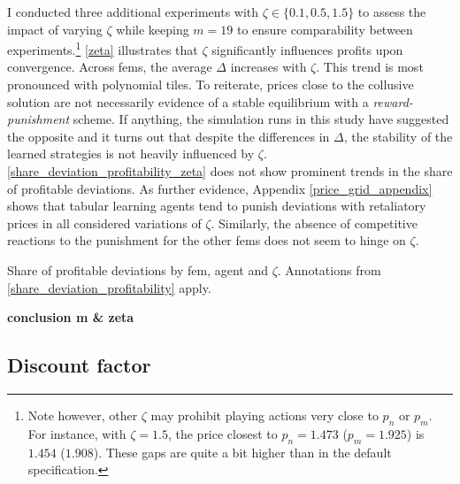 I conducted three additional experiments with $\zeta \in \{0.1, 0.5, 1.5\}$ to assess the impact of varying $\zeta$ while keeping $m=19$ to ensure comparability between experiments.\footnote{Note however, other $\zeta$ may prohibit playing actions very close to $p_n$ or $p_m$. For instance, with $\zeta = 1.5$, the price closest to $p_n = 1.473$ ($p_m = 1.925$) is $1.454$ ($1.908$). These gaps are quite a bit higher than in the default specification.} \autoref{zeta} illustrates that $\zeta$ significantly influences profits upon convergence. Across \gls{fem}s, the average $\Delta$ increases with $\zeta$. This trend is most pronounced with polynomial tiles. To reiterate, prices close to the collusive solution are not necessarily evidence of a stable equilibrium with a \emph{reward-punishment} scheme. If anything, the simulation runs in this study have suggested the opposite and it turns out that despite the differences in $\Delta$, the stability of the learned strategies is not heavily influenced by $\zeta$. \autoref{share_deviation_profitability_zeta} does not show prominent trends in the share of profitable deviations. As further evidence, Appendix \ref{price_grid_appendix} shows that tabular learning agents tend to punish deviations with retaliatory prices in all considered variations of $\zeta$. Similarly, the absence of competitive reactions to the punishment for the other \gls{fem}s does not seem to hinge on $\zeta$.

\begin{table}
	\centering
	
	\caption[Share of profitable deviations by \gls{fem}, agent and $\zeta$]{Share of profitable deviations by \gls{fem}, agent and $\zeta$. Annotations from \autoref{share_deviation_profitability} apply.}
	\label{share_deviation_profitability_zeta}
\end{table}

\textbf{conclusion m \& zeta}

\subsection{Discount factor}\label{discounting}


